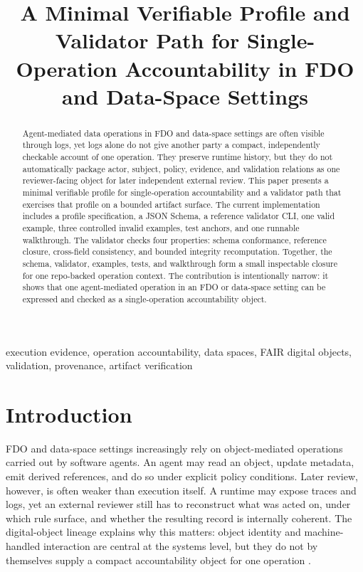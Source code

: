 \documentclass[conference]{IEEEtran}
\title{A Minimal Verifiable Profile and Validator Path for Single-Operation Accountability in FDO and Data-Space Settings}
\author{
\IEEEauthorblockN{AUTHOR NAME HERE}
\IEEEauthorblockA{
AFFILIATION HERE\\
COUNTRY HERE\\
EMAIL HERE
}
}
\begin{document}
\maketitle

\begin{abstract}
Agent-mediated data operations in FDO and data-space settings are often visible through logs, yet logs alone do not give another party a compact, independently checkable account of one operation. They preserve runtime history, but they do not automatically package actor, subject, policy, evidence, and validation relations as one reviewer-facing object for later independent external review. This paper presents a minimal verifiable profile for single-operation accountability and a validator path that exercises that profile on a bounded artifact surface. The current implementation includes a profile specification, a JSON Schema, a reference validator CLI, one valid example, three controlled invalid examples, test anchors, and one runnable walkthrough. The validator checks four properties: schema conformance, reference closure, cross-field consistency, and bounded integrity recomputation. Together, the schema, validator, examples, tests, and walkthrough form a small inspectable closure for one repo-backed operation context. The contribution is intentionally narrow: it shows that one agent-mediated operation in an FDO or data-space setting can be expressed and checked as a single-operation accountability object.
\end{abstract}

\begin{IEEEkeywords}
execution evidence, operation accountability, data spaces, FAIR digital objects, validation, provenance, artifact verification
\end{IEEEkeywords}

\section{Introduction}

FDO and data-space settings increasingly rely on object-mediated operations carried out by software agents. An agent may read an object, update metadata, emit derived references, and do so under explicit policy conditions. Later review, however, is often weaker than execution itself. A runtime may expose traces and logs, yet an external reviewer still has to reconstruct what was acted on, under which rule surface, and whether the resulting record is internally coherent. The digital-object lineage explains why this matters: object identity and machine-handled interaction are central at the systems level, but they do not by themselves supply a compact accountability object for one operation \cite{kahn2006framework,dona2018doip,soilandreyes2024evaluating}.
\end{document}

